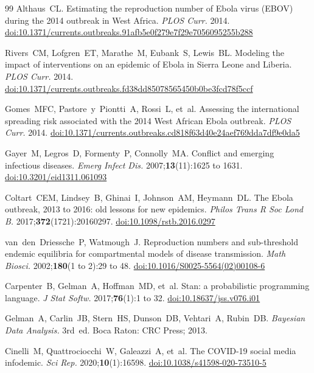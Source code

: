 \documentclass[12pt,a4paper]{article}
\begin{document}
\begin{thebibliography}{99}
Althaus~CL.
Estimating the reproduction number of Ebola virus (EBOV) during the
2014 outbreak in West Africa.
\textit{PLOS Curr.} 2014.
\href{https://doi.org/10.1371/currents.outbreaks.91afb5e0f279e7f29e7056095255b288}{doi:10.1371/currents.outbreaks.91afb5e0f279e7f29e7056095255b288}

Rivers~CM, Lofgren~ET, Marathe~M, Eubank~S, Lewis~BL.
Modeling the impact of interventions on an epidemic of Ebola in Sierra
Leone and Liberia.
\textit{PLOS Curr.} 2014.
\href{https://doi.org/10.1371/currents.outbreaks.fd38dd85078565450b0be3fcd78f5ccf}{doi:10.1371/currents.outbreaks.fd38dd85078565450b0be3fcd78f5ccf}

Gomes~MFC, Pastore~y~Piontti~A, Rossi~L, et~al.
Assessing the international spreading risk associated with the 2014
West African Ebola outbreak.
\textit{PLOS Curr.} 2014.
\href{https://doi.org/10.1371/currents.outbreaks.cd818f63d40e24aef769dda7df9e0da5}{doi:10.1371/currents.outbreaks.cd818f63d40e24aef769dda7df9e0da5}

Gayer~M, Legros~D, Formenty~P, Connolly~MA.
Conflict and emerging infectious diseases.
\textit{Emerg Infect Dis.} 2007;\textbf{13}(11):1625 to 1631.
\href{https://doi.org/10.3201/eid1311.061093}{doi:10.3201/eid1311.061093}

Coltart~CEM, Lindsey~B, Ghinai~I, Johnson~AM, Heymann~DL.
The Ebola outbreak, 2013 to 2016: old lessons for new epidemics.
\textit{Philos Trans R Soc Lond B.} 2017;\textbf{372}(1721):20160297.
\href{https://doi.org/10.1098/rstb.2016.0297}{doi:10.1098/rstb.2016.0297}

van~den~Driessche~P, Watmough~J.
Reproduction numbers and sub-threshold endemic equilibria for
compartmental models of disease transmission.
\textit{Math Biosci.} 2002;\textbf{180}(1 to 2):29 to 48.
\href{https://doi.org/10.1016/S0025-5564(02)00108-6}{doi:10.1016/S0025-5564(02)00108-6}

Carpenter~B, Gelman~A, Hoffman~MD, et~al.
Stan: a probabilistic programming language.
\textit{J Stat Softw.} 2017;\textbf{76}(1):1 to 32.
\href{https://doi.org/10.18637/jss.v076.i01}{doi:10.18637/jss.v076.i01}

Gelman~A, Carlin~JB, Stern~HS, Dunson~DB, Vehtari~A, Rubin~DB.
\textit{Bayesian Data Analysis.} 3rd~ed. Boca Raton: CRC Press; 2013.

Cinelli~M, Quattrociocchi~W, Galeazzi~A, et~al.
The COVID-19 social media infodemic.
\textit{Sci Rep.} 2020;\textbf{10}(1):16598.
\href{https://doi.org/10.1038/s41598-020-73510-5}{doi:10.1038/s41598-020-73510-5}


\end{thebibliography}
\end{document}

